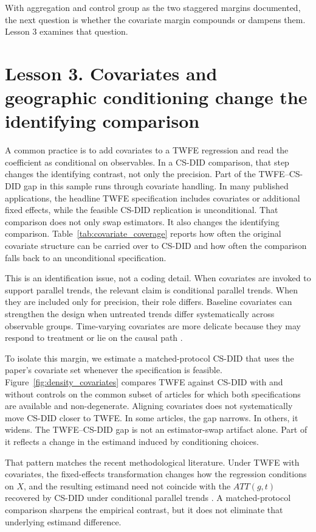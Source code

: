 With aggregation and control group as the two staggered margins documented, the next question is whether the covariate margin compounds or dampens them. Lesson 3 examines that question.






\newpage
\section{Lesson 3. Covariates and geographic conditioning change the identifying comparison}

A common practice is to add covariates to a TWFE regression and read the coefficient as conditional on observables. In a CS-DID comparison, that step changes the identifying contrast, not only the precision. Part of the TWFE--CS-DID gap in this sample runs through covariate handling. In many published applications, the headline TWFE specification includes covariates or additional fixed effects, while the feasible CS-DID replication is unconditional. That comparison does not only swap estimators. It also changes the identifying comparison. Table~\ref{tab:covariate_coverage} reports how often the original covariate structure can be carried over to CS-DID and how often the comparison falls back to an unconditional specification.

This is an identification issue, not a coding detail. When covariates are invoked to support parallel trends, the relevant claim is conditional parallel trends. When they are included only for precision, their role differs. Baseline covariates can strengthen the design when untreated trends differ systematically across observable groups. Time-varying covariates are more delicate because they may respond to treatment or lie on the causal path \parencite{caetano2022difference,caetano_callaway2024_hiddenlinearity}.

To isolate this margin, we estimate a matched-protocol CS-DID that uses the paper's covariate set whenever the specification is feasible. Figure~\ref{fig:density_covariates} compares TWFE against CS-DID with and without controls on the common subset of articles for which both specifications are available and non-degenerate. Aligning covariates does not systematically move CS-DID closer to TWFE. In some articles, the gap narrows. In others, it widens. The TWFE--CS-DID gap is not an estimator-swap artifact alone. Part of it reflects a change in the estimand induced by conditioning choices.

That pattern matches the recent methodological literature. Under TWFE with covariates, the fixed-effects transformation changes how the regression conditions on \(X\), and the resulting estimand need not coincide with the \(ATT(g,t)\) recovered by CS-DID under conditional parallel trends \parencite{callaway2021difference,caetano2022difference,caetano_callaway2024_hiddenlinearity,wooldridge2025two}. A matched-protocol comparison sharpens the empirical contrast, but it does not eliminate that underlying estimand difference.

